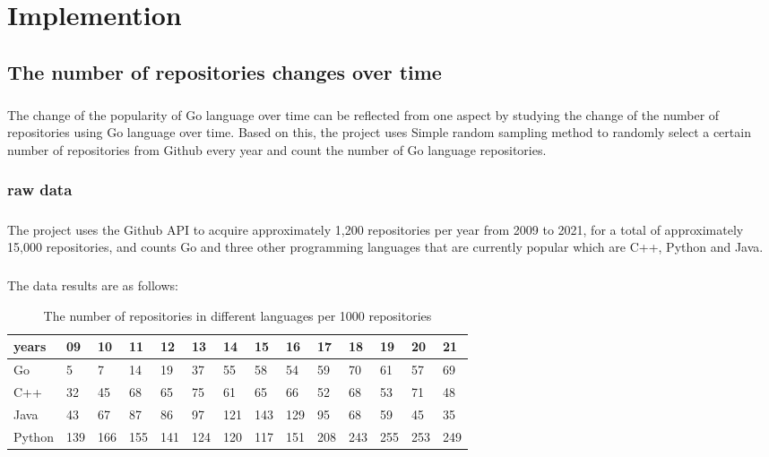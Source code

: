 \documentclass[11pt,onside,a4paper,fleqn]{report}
\renewcommand\arraystretch{2}
\begin{document}
\chapter{Implemention}

\section{The number of repositories changes over time}
\paragraph{} The change of the popularity of Go language over time can be reflected from one aspect by studying the change of the number of repositories using Go language over time. Based on this, the project uses Simple random sampling method to randomly select a certain number of repositories from Github every year and count the number of Go language repositories.

\subsection{raw data}
\paragraph{} The project uses the Github API to acquire approximately 1,200 repositories per year from 2009 to 2021, for a total of approximately 15,000 repositories, and counts Go and three other programming languages that are currently popular which are C++, Python and Java.

\paragraph{} The data results are as follows:

\begin{table}[ht]
\renewcommand{\arraystretch}{1.3}
\setlength\tabcolsep{5pt}
\begin{tabular}{@{}llllllllllllll@{}}
\toprule
years  & 09 & 10 & 11 & 12 & 13 & 14 & 15 & 16 & 17 & 18 & 19 & 20 & 21 \\ \midrule
Go     & 5    & 7    & 14   & 19   & 37   & 55   & 58   & 54   & 59   & 70   & 61   & 57   & 69   \\
C++    & 32   & 45   & 68   & 65   & 75   & 61   & 65   & 66   & 52   & 68   & 53   & 71   & 48   \\
Java   & 43   & 67   & 87   & 86   & 97   & 121  & 143  & 129  & 95   & 68   & 59   & 45   & 35   \\
Python & 139  & 166  & 155  & 141  & 124  & 120  & 117  & 151  & 208  & 243  & 255  & 253  & 249  \\ \bottomrule
\end{tabular}
\caption{The number of repositories in different languages per 1000 repositories}
\end{table}
\end{document}
